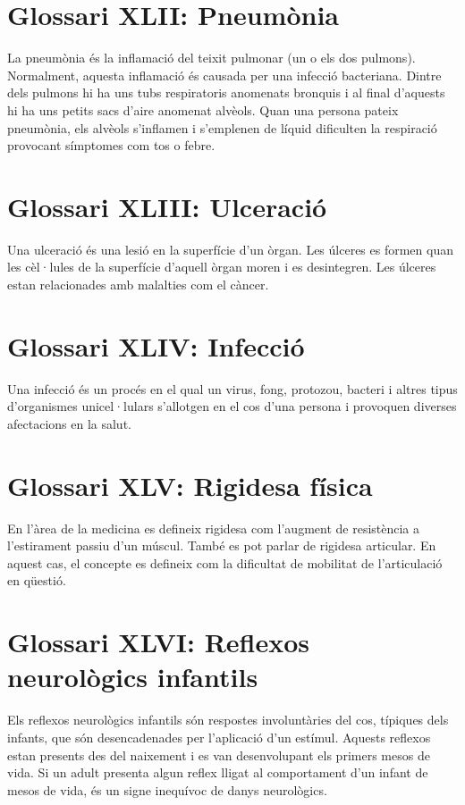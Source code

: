 \documentclass[a4paper,12pt]{report}
\begin{document}
\section*{Glossari XLII: Pneumònia}
La pneumònia és la inflamació del teixit pulmonar (un o els dos pulmons). Normalment, aquesta inflamació és causada per una infecció bacteriana. Dintre dels pulmons hi ha uns tubs respiratoris anomenats bronquis i al final d'aquests hi ha uns petits sacs d'aire anomenat alvèols. Quan una persona pateix pneumònia, els alvèols s'inflamen i s'emplenen de líquid dificulten la respiració provocant símptomes com tos o febre.
\section*{Glossari XLIII: Ulceració}
Una ulceració és una lesió en la superfície d'un òrgan. Les úlceres es formen quan les cèl·lules de la superfície d'aquell òrgan moren i es desintegren. Les úlceres estan relacionades amb malalties com el càncer.
\section*{Glossari XLIV: Infecció}
Una infecció és un procés en el qual un virus, fong, protozou, bacteri i altres tipus d'organismes unicel·lulars s'allotgen en el cos d'una persona i provoquen diverses afectacions en la salut.
\section*{Glossari XLV: Rigidesa física}
En l'àrea de la medicina es defineix rigidesa com l'augment de resistència a l'estirament passiu d'un múscul. També es pot parlar de rigidesa articular. En aquest cas, el concepte es defineix com la dificultat de mobilitat de l'articulació en qüestió.
\section*{Glossari XLVI: Reflexos neurològics infantils}
Els reflexos neurològics infantils són respostes involuntàries del cos, típiques dels infants, que són desencadenades per l'aplicació d'un estímul. Aquests reflexos estan presents des del naixement i es van desenvolupant els primers mesos de vida. Si un adult presenta algun reflex lligat al comportament d'un infant de mesos de vida, és un signe inequívoc de danys neurològics.
\end{document}
